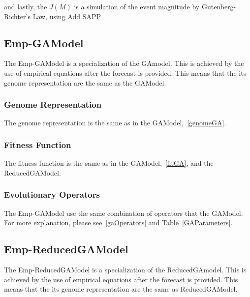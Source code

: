 and lastly, the $J(M)$ is a simulation of the event magnitude by
Gutenberg-Richter's Law, using Add SAPP\\
%


\subsection{Emp-GAModel}\label{emp-gamodel}
The Emp-GAModel is a specialization of the GAmodel. This is achieved by the use of empirical equations after the forecast is provided. This means that the its genome representation are the same as the GAModel.\\
\subsubsection{Genome Representation}
The genome representation is the same as in the GAModel,~\ref{genomeGA}.\\

\subsubsection{Fitness Function}
The fitness function is the same as in the GAModel,~\ref{fitGA}, and the ReducedGAModel.\\
\subsubsection{Evolutionary Operators}
The Emp-GAModel use the same combination of operators that the GAModel. For more explanation, please see~\ref{gaOperators} and Table~\ref{GAParameters}.\\

\subsection{Emp-ReducedGAModel}\label{emp-reducedgamodel}
The Emp-ReducedGAModel is a specialization of the ReducedGAmodel. This is achieved by the use of empirical equations after the forecast is provided. This means that the its genome representation are the same as ReducedGAModel.\\

